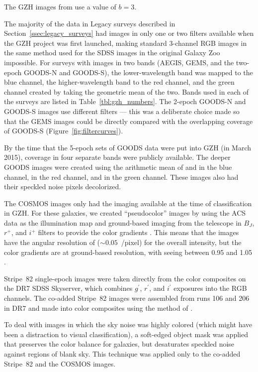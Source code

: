 \documentclass[twocolumn]{aastex6}
\begin{document}
\noindent The GZH images from \citet{gri12} use a value of $b=3$. 

The majority of the data in Legacy surveys described in Section~\ref{ssec:legacy_surveys} had images in only one or two filters available when the GZH project was first launched, making standard 3-channel RGB images in the same method used for the SDSS images in the original Galaxy Zoo impossible. For surveys with images in two bands (AEGIS, GEMS, and the two-epoch GOODS-N and GOODS-S), the lower-wavelength band was mapped to the blue channel, the higher-wavelength band to the red channel, and the green channel created by taking the geometric mean of the two. Bands used in each of the surveys are listed in Table~\ref{tbl:gzh_numbers}. The 2-epoch GOODS-N and GOODS-S images use different filters --- this was a deliberate choice made so that the GEMS images could be directly compared with the overlapping coverage of GOODS-S (Figure~\ref{fig:filtercurves}). 

By the time that the 5-epoch sets of GOODS data were put into GZH (in March 2015), coverage in four separate \hst{} bands were publicly available. The deeper GOODS images were created using the arithmetic mean of \Bband{} and \Vband{} in the blue channel, \Iband{} in the red channel, and \zband{} in the green channel. These images also had their speckled noise pixels decolorized. 

The COSMOS images only had the \Iband{} imaging available at the time of classification in GZH. For these galaxies, we created ``pseudocolor'' images by using the ACS \Iband{} data as the illumination map and ground-based imaging from the \subaru{} telescope in $B_J$, $r^+$, and $i^+$ filters to provide the color gradients \citep[see][for further details]{gri12}. This means that the images have the angular resolution of \hst{} ($\sim0.05$~\arcsec/pixel) for the overall intensity, but the color gradients are at ground-based resolution, with seeing between 0.95\arcsec{} and 1.05\arcsec{} \citep{tan07}.

Stripe~82 single-epoch images were taken directly from the color composites on the DR7 SDSS Skyserver, which combines $g^{\prime}$, $r^{\prime}$, and $i^{\prime}$ exposures into the RGB channels. The co-added Stripe~82 images were assembled from runs 106 and 206 in DR7 and made into color composites using the method of \citet{lup04}.

To deal with images in which the sky noise was highly colored (which might have been a distraction to visual classification), a soft-edged object mask was applied that preserves the color balance for galaxies, but desaturates speckled noise against regions of blank sky. This technique was applied only to the co-added Stripe~82 and the COSMOS images.
\end{document}
